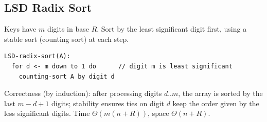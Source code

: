 \subsection{LSD Radix Sort}

Keys have $m$ digits in base $R$. Sort by the least significant digit first,
using a stable sort (counting sort) at each step.
\begin{lstlisting}
LSD-radix-sort(A):
  for d <- m down to 1 do      // digit m is least significant
    counting-sort A by digit d
\end{lstlisting}
Correctness (by induction): after processing digits $d..m$, the array is sorted
by the last $m - d + 1$ digits; stability ensures ties on digit $d$ keep the
order given by the less significant digits. Time $\Theta(m(n + R))$, space
$\Theta(n + R)$.


